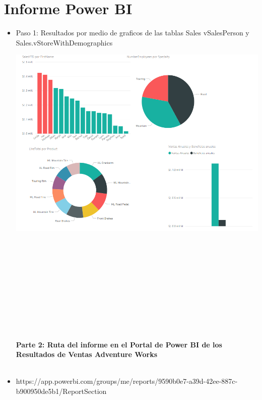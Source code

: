 \section{Informe Power BI} 
\begin{flushleft}


\begin{itemize}
\textbf{Parte1: Resultados de Ventas Adventure Works }\\
\textbf{ }\\
  \item Paso 1: Resultados por medio de graficos de las tablas  Sales vSalesPerson y Sales.vStoreWithDemographics
\begin{center}
	\includegraphics[width=20cm]{./Imagenes/resultado} 
	\end{center}


\textbf{ }\\
\textbf{ }\\
\textbf{ }\\
\textbf{ }\\
\textbf{ }\\
\textbf{ }\\
\textbf{ }\\
\textbf{ }\\
\textbf{ }\\
\textbf{ }\\

\textbf{Parte 2: Ruta del informe en el Portal de Power BI de los Resultados de Ventas Adventure Works }\\
\textbf{ }\\
  \item  https://app.powerbi.com/groups/me/reports/9590b0e7-a39d-42ee-887c-b900950de5b1/ReportSection

\end{itemize} 


\end{flushleft}